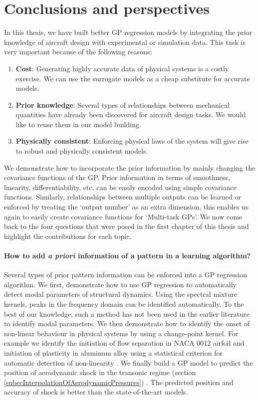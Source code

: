 \chapter{Conclusions and perspectives}
\label{chapConclusions}

In this thesis, we have built better GP regression models by integrating the prior knowledge of aircraft design with experimental or simulation data. This task is very important because of the following reasons:

\begin{enumerate}
\item \textbf{Cost}: Generating highly accurate data of physical systems is a costly exercise. We can use the surrogate models as a cheap substitute for accurate models.
\item \textbf{Prior knowledge}: Several types of relationships between mechanical quantities have already been discovered for aircraft design tasks. We would like to reuse them in our model building. 
\item \textbf{Physically consistent}: Enforcing physical laws of the system will give rise to robust and physically consistent models.
\end{enumerate}

We demonstrate how to incorporate the prior information by mainly changing the covariance functions of the GP. Prior information in terms of smoothness, linearity, differentiability, etc. can be easily encoded using simple covariance functions. Similarly, relationships between multiple outputs can be learned or enforced by treating the `output number' as an extra dimension, this enables us again to easily create covariance functions for `Multi-task GPs'. We now come back to the four questions that were posed in the first chapter of this thesis and highlight the contributions for each topic.

\subsubsection*{How to add \textit{a priori} information of a pattern in a learning algorithm?}
Several types of prior pattern information can be enforced into a GP regression algorithm. We first,  demonstrate how to use GP regression to automatically detect modal parameters of structural dynamics. Using the spectral mixture kernels, peaks in the frequency domain can be identified automatically. To the best of our knowledge, such a method has not been used in the earlier literature to identify modal parameters. We then demonstrate how to identify the onset of non-linear behaviour in physical systems by using a change-point kernel. For example we identify the initiation of flow separation in NACA 0012 airfoil and initiation of plasticity in aluminum alloy using a statistical criterion for automatic detection of non-linearity \cite{chiplunkar:hal-01555401}. We finally build a GP model to predict the position of aerodynamic shock in the transonic regime (section \ref{subecInterpolationOfAerodynamicPressures}) \cite{oatao18004}. The predicted position and accuracy of shock is better than the state-of-the-art models. 
